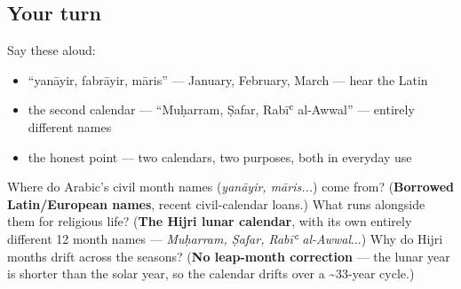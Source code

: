\subsection*{Your turn}
Say these aloud:

\begin{itemize}
\raggedright
  \item \textquotedblleft{}yanāyir, fabrāyir, māris\textquotedblright{} — January, February, March — hear the Latin
  \item the second calendar — \textquotedblleft{}Muḥarram, Ṣafar, Rabīʿ al-Awwal\textquotedblright{} — entirely different names
  \item the honest point — two calendars, two purposes, both in everyday use
\end{itemize}

\begin{tcolorbox}[breakable,colback=teal!4,colframe=teal!35!black,title={Before you move on}]
Where do Arabic's civil month names (\emph{yanāyir, māris...}) come from? (\textbf{Borrowed Latin/European names}, recent civil-calendar loans.) What runs alongside them for religious life? (\textbf{The Hijri lunar calendar}, with its own entirely different 12 month names — \emph{Muḥarram, Ṣafar, Rabīʿ al-Awwal}...) Why do Hijri months drift across the seasons? (\textbf{No leap-month correction} — the lunar year is shorter than the solar year, so the calendar drifts over a \textasciitilde{}33-year cycle.)
\end{tcolorbox}
